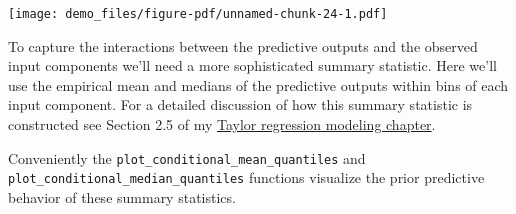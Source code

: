 \documentclass[
  letterpaper,
  DIV=11,
  numbers=noendperiod]{scrartcl}
\newenvironment{Shaded}{\begin{snugshade}}{\end{snugshade}}
\newcommand{\AttributeTok}[1]{\textcolor[rgb]{0.40,0.45,0.13}{#1}}
\newcommand{\ControlFlowTok}[1]{\textcolor[rgb]{0.00,0.23,0.31}{#1}}
\newcommand{\DecValTok}[1]{\textcolor[rgb]{0.68,0.00,0.00}{#1}}
\newcommand{\FunctionTok}[1]{\textcolor[rgb]{0.28,0.35,0.67}{#1}}
\newcommand{\NormalTok}[1]{\textcolor[rgb]{0.00,0.23,0.31}{#1}}
\newcommand{\OtherTok}[1]{\textcolor[rgb]{0.00,0.23,0.31}{#1}}
\newcommand{\SpecialCharTok}[1]{\textcolor[rgb]{0.37,0.37,0.37}{#1}}
\newcommand{\StringTok}[1]{\textcolor[rgb]{0.13,0.47,0.30}{#1}}
\begin{document}
\texttt{[image: demo\_files/figure-pdf/unnamed-chunk-24-1.pdf]}

To capture the interactions between the predictive outputs and the
observed input components we'll need a more sophisticated summary
statistic. Here we'll use the empirical mean and medians of the
predictive outputs within bins of each input component. For a detailed
discussion of how this summary statistic is constructed see Section 2.5
of my
\href{https://betanalpha.github.io/assets/case_studies/taylor_models.html\#25_Posterior_Retrodictive_Checks}{Taylor
regression modeling chapter}.

Conveniently the \texttt{plot\_conditional\_mean\_quantiles} and
\texttt{plot\_conditional\_median\_quantiles} functions visualize the
prior predictive behavior of these summary statistics.

\begin{Shaded}
\end{Shaded}
\end{document}
